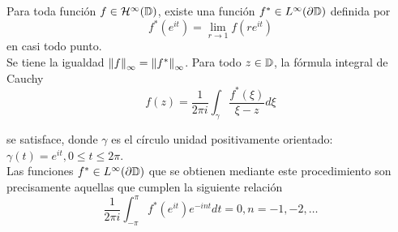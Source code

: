 \begin{theorem}
    Para toda función $f \in \mathcal{H}^{\infty}(\mathbb{D})$, existe una función $f^* \in L^{\infty} (\partial \mathbb{D})$ definida por
    \begin{equation}
        \label{eq:fatou1}
        f^*(e^{it}) = \lim_{r \to 1} f(re^{it})
    \end{equation}
    en casi todo punto. \\

    Se tiene la igualdad $\left\lVert f\right\rVert_{\infty} = \left\lVert f^*\right\rVert_{\infty}$. Para todo $z \in \mathbb{D}$, la fórmula integral de Cauchy
    \begin{equation}
        \label{eq:fatou2}
        f(z) = \dfrac{1}{2 \pi i} \int_{\gamma} \dfrac{f^*(\xi)}{\xi - z} d\xi
    \end{equation}

    se satisface, donde $\gamma$ es el círculo unidad positivamente orientado: $\gamma(t) = e^{it}, 0 \leq t \leq 2 \pi$. \\

    Las funciones $f^* \in L^{\infty}(\partial \mathbb{D})$ que se obtienen mediante este procedimiento son precisamente aquellas que cumplen la siguiente relación
    \begin{equation}
        \label{eq:fatou3}
        \dfrac{1}{2 \pi i} \int_{-\pi}^{\pi} f^*(e^{it})e^{-int} dt = 0, n = -1,-2, \dots
    \end{equation}
\end{theorem}

